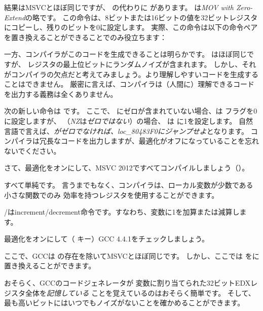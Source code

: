 結果はMSVCとほぼ同じですが、 \MOVSX の代わりに \MOVZX があります。 
\MOVZX は\emph{MOV with Zero-Extend}の略です。
この命令は、8ビットまたは16ビットの値を32ビットレジスタにコピーし、残りのビットを0に設定します。
実際、この命令は以下の命令ペアを置き換えることができることでのみ役立ちます：

一方、コンパイラがこのコードを生成できることは明らかです。
 はほぼ同じですが、
\EAX レジスタの最上位ビットにランダムノイズが含まれます。
しかし、それがコンパイラの欠点だと考えてみましょう。より理解しやすいコードを生成することはできません。
厳密に言えば、コンパイラは（人間に）理解できるコードを出力する義務は全くありません。


次の新しい命令は \SETNZ です。
ここで、 \AL にゼロが含まれていない場合、は \ZF フラグを0に設定しますが、
（\emph{NZ}は\emph{ゼロではない}）の場合、 \SETNZ は \AL に1を設定します。
自然言語で言えば、\emph{\AL がゼロでなければ、loc\_80483F0にジャンプせよ}となります。
コンパイラは冗長なコードを出力しますが、最適化がオフになっていることを忘れないでください。

\label{strlen_MSVC_Ox}

さて、最適化をオンにして、MSVC 2012ですべてコンパイルしましょう（\Ox）。



すべて単純です。
言うまでもなく、コンパイラは、ローカル変数が少数である小さな関数でのみ
効率を持つレジスタを使用することができます。

\INC/\DEC は\gls{increment}/\gls{decrement}命令です。すなわち、変数に1を加算または減算します。




最適化をオンにして（ \Othree キー）GCC 4.4.1をチェックしましょう。


 
ここで、GCCは \MOVZX の存在を除いてMSVCとほぼ同じです。 
しかし、ここでは \MOVZX をに置き換えることができます。

おそらく、GCCのコードジェネレータが \Tchar 変数に割り当てられた32ビットEDXレジスタ全体を\emph{記憶している}
ことを覚えているのはおそらく簡単です。
そして、最も高いビットにはいつでもノイズがないことを確かめることができます。

